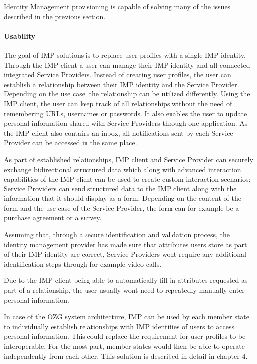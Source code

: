Identity Management provisioning is capable of solving many of the issues described in the previous section.

\paragraph{Usability}

The goal of IMP solutions is to replace user profiles with a single IMP identity. Through the IMP client a user can manage their IMP identity and all connected integrated Service Providers. Instead of creating user profiles, the user can establish a relationship between their IMP identity and the Service Provider. Depending on the use case, the relationship can be utilized differently. Using the IMP client, the user can keep track of all relationships without the need of remembering URLs, usernames or passwords. It also enables the user to update personal information shared with Service Providers through one application. As the IMP client also contains an inbox, all notifications sent by each Service Provider can be accessed in the same place.

As part of established relationships, IMP client and Service Provider can securely exchange bidirectional structured data which along with advanced interaction capabilities of the IMP client can be used to create custom interaction scenarios: Service Providers can send structured data to the IMP client along with the information that it should display as a form. Depending on the content of the form and the use case of the Service Provider, the form can for example be a purchase agreement or a survey. 

Assuming that, through a secure identification and validation process, the identity management provider has made sure that attributes users store as part of their IMP identity are correct, Service Providers wont require any additional identification steps through for example video calls.

Due to the IMP client being able to automatically fill in attributes requested as part of a relationship, the user usually wont need to repeatedly manually enter personal information.

In case of the OZG system architecture, IMP can be used by each member state to individually establish relationships with IMP identities of users to access personal information. This could replace the requirement for user profiles to be interoperable. For the most part, member states would then be able to operate independently from each other. This solution is described in detail in chapter 4.

